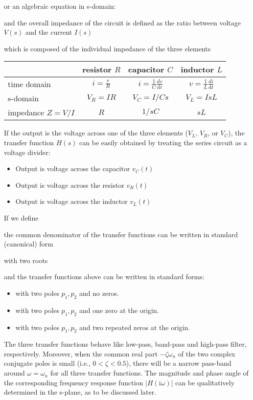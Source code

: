 	or an algebraic equation in s-domain:
	
	and the overall impedance of the circuit is defined as the ratio between voltage 
	$V(s)$ and the current $I(s)$ 
	
	which is composed of the individual impedance of the three elements
	
	\vskip 0.2in
	
	\begin{tabular}{l|c|c|c} \hline
		& resistor $R$ & capacitor $C$ & inductor $L$  \\ \hline
	time domain & $i=\frac{v}{R}$ & $i=\frac{1}{C}\frac{dv}{\mathrm{d}t}$ & $v=\frac{1}{L}\frac{di}{\mathrm{d}t}$ 
	\\ \hline 
	s-domain    & $V_R=IR$ & $V_C=I/Cs$ & $V_L=IsL$	\\ \hline
	impedance $Z=V/I$   &    $R$   &   $1/sC$   &   $sL$    \\ \hline
	\end{tabular}
	\vskip 0.2in
	If the output is the voltage across one of the three elements ($V_L$, $V_R$, or $V_C$), 
	the transfer function $H(s)$ can be easily obtained by treating the series circuit as a
	voltage divider: 
	\begin{itemize}
	\item Output is voltage across the capacitor $v_C(t)$
	
	\item Output is voltage across the resistor $v_R(t)$
	
	\item Output is voltage across the inductor $v_L(t)$
	
	\end{itemize}
	If we define
	
	the common denominator of the transfer functions can be written in standard 
	(canonical) form
	
	with two roots
	
	and the transfer functions above can be written in standard forms:
	\begin{itemize}
	\item 
	
	with two poles $p_1, p_2$ and no zeros. 
	\item 
	
	with two poles $p_1, p_2$ and one zero at the origin. 
	\item 
	
	with two poles $p_1, p_2$ and two repeated zeros at the origin. 
	\end{itemize}
	The three transfer functions behave like low-pass, band-pass and high-pass filter, 
	respectively. Moreover, when the common real part $-\zeta \omega_n$ of the two complex
	conjugate poles is small (i.e., $0<\zeta < 0.5$), there will be a narrow pass-band 
	around $\omega=\omega_n$ for all three transfer functions. The magnitude and phase 
	angle of the corresponding frequency response function $|H(\mathrm{i}\omega)|$ can be 
	qualitatively determined in the s-plane, as to be discussed later.
	
